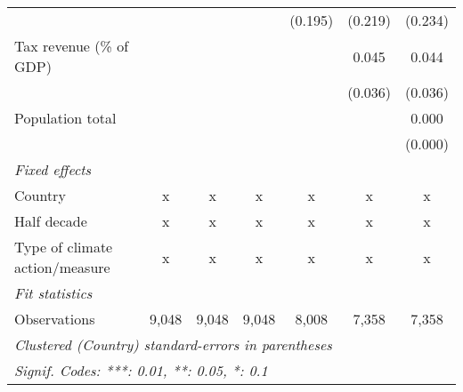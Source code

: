 \begin{tabular}{lcccccc}
                                                                     &         &         &               & (0.195)       & (0.219)      & (0.234)\\   
   Tax revenue (\% of GDP)                                           &         &         &               &               & 0.045        & 0.044\\   
                                                                     &         &         &               &               & (0.036)      & (0.036)\\   
   Population total                                                  &         &         &               &               &              & 0.000\\   
                                                                     &         &         &               &               &              & (0.000)\\   
   \emph{Fixed effects}\\
   Country                                                           & x       & x       & x             & x             & x            & x\\  
   Half decade                                                       & x       & x       & x             & x             & x            & x\\  
   Type of climate action/measure                                    & x       & x       & x             & x             & x            & x\\  
   \midrule \emph{Fit statistics}\\
   Observations                                                      & 9,048   & 9,048   & 9,048         & 8,008         & 7,358        & 7,358\\  
   \midrule
   \multicolumn{7}{l}{\emph{Clustered (Country) standard-errors in parentheses}}\\
   \multicolumn{7}{l}{\emph{Signif. Codes: ***: 0.01, **: 0.05, *: 0.1}}\\
\end{tabular}
\par\endgroup


